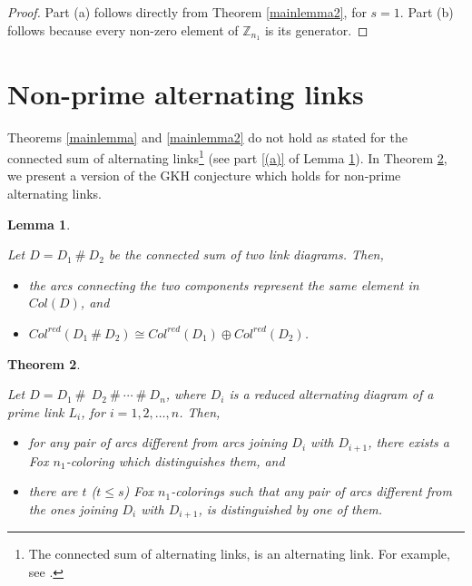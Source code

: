 \documentclass[11pt]{amsart}
\makeatletter
\def\namedlabel#1#2{\begingroup
    #2%
    \def\@currentlabel{#2}%
    \phantomsection\label{#1}\endgroup
}
\newtheorem{theorem}{Theorem}[section]
\newtheorem{lemma}[theorem]{Lemma}
\makeatother
\begin{document}
\begin{proof}

Part (a) follows directly from Theorem \ref{mainlemma2}, for $s=1$. Part (b) follows because every non-zero element of $\mathbb{Z}_{n_1}$ is its generator.

\end{proof}

\section{Non-prime alternating links}\label{nonprimealt}

Theorems \ref{mainlemma} and \ref{mainlemma2}  do not hold as stated for the connected sum of alternating links\footnote{The connected sum of alternating links, is an alternating link. For example, see \cite{PBIMW}.} (see part \ref{(a)} of Lemma \ref{nonprimelemma}). In Theorem \ref{connectedsumnonprime}, we present a version of the GKH conjecture which holds for non-prime alternating links.

\begin{lemma}\cite{Prz1} 
\label{nonprimelemma}

    Let $D= D_1 \ \# \ D_2$ be the connected sum of two link diagrams. Then,
    
\begin{itemize}
    \item [\namedlabel{(a)}{(a)}] the arcs connecting the two components represent the same element in $Col(D)$, and
    
    \item[(b)] $Col^{red}(D_1 \ \# \ D_2) \cong Col^{red}(D_1)\oplus Col^{red}(D_2) $.
     
\end{itemize}
    
\end{lemma}

\begin{theorem}\label{connectedsumnonprime}

    Let $D=  D_1 \ \# \ \ D_2  \  \# \ \cdots \  \# \ D_n$, where $D_i$ is a reduced alternating diagram of a prime link $L_i$, for $i=1, 2, \dots, n$. Then, 
    
\begin{itemize}

    \item [(a)] for any pair of arcs different from arcs joining $D_i$  with $D_{i+1}$, there exists a Fox $n_1$-coloring which distinguishes them, and 
    
    \item [(b)] there are $t$ ($t \leq s$) Fox $n_1$-colorings such that any pair of arcs different from the ones joining $D_i$ with $D_{i+1}$, is distinguished by one of them.
    
\end{itemize}
    
\end{theorem}
\end{document}
